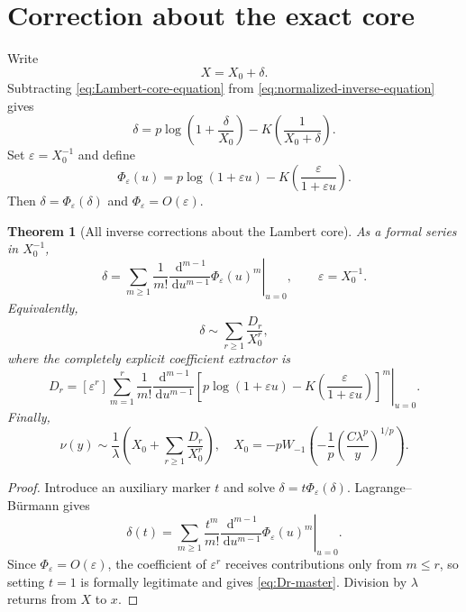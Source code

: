 \documentclass[11pt,a4paper,oneside,openany]{book}
\newtheorem{theorem}{Theorem}[chapter]
\theoremstyle{definition}
\theoremstyle{remark}
\newcommand{\dd}{\,\mathrm d}
\begin{document}
\section{Correction about the exact core}
Write
\begin{equation}
 X=X_0+\delta.
 \label{eq:X-delta}
\end{equation}
Subtracting \cref{eq:Lambert-core-equation} from
\cref{eq:normalized-inverse-equation} gives
\begin{equation}
 \delta=p\log\left(1+\frac{\delta}{X_0}\right)
 -K\!\left(\frac1{X_0+\delta}\right).
 \label{eq:delta-fixed-point}
\end{equation}
Set $\varepsilon=X_0^{-1}$ and define
\begin{equation}
 \Phi_\varepsilon(u)
 =p\log(1+\varepsilon u)
  -K\!\left(\frac{\varepsilon}{1+\varepsilon u}\right).
 \label{eq:Phi-epsilon}
\end{equation}
Then $\delta=\Phi_\varepsilon(\delta)$ and
$\Phi_\varepsilon=O(\varepsilon)$.

\begin{theorem}[All inverse corrections about the Lambert core]
\label{thm:delta-Lagrange}
As a formal series in $X_0^{-1}$,
\begin{equation}
 \boxed{
 \delta=\sum_{m\ge1}\frac1{m!}
 \left.\frac{\dd^{m-1}}{\dd u^{m-1}}
 \Phi_\varepsilon(u)^m\right|_{u=0},
 \qquad \varepsilon=X_0^{-1}.}
 \label{eq:delta-Lagrange}
\end{equation}
Equivalently,
\begin{equation}
 \delta\sim\sum_{r\ge1}\frac{D_r}{X_0^r},
 \label{eq:delta-D}
\end{equation}
where the completely explicit coefficient extractor is
\begin{equation}
 \boxed{
 D_r=[\varepsilon^r]
 \sum_{m=1}^{r}\frac1{m!}
 \left.\frac{\dd^{m-1}}{\dd u^{m-1}}
 \left[p\log(1+\varepsilon u)
 -K\!\left(\frac{\varepsilon}{1+\varepsilon u}\right)\right]^m
 \right|_{u=0}.}
 \label{eq:Dr-master}
\end{equation}
Finally,
\begin{equation}
 \boxed{
 \nu(y)\sim\frac1\lambda\left(
 X_0+\sum_{r\ge1}\frac{D_r}{X_0^r}\right),
 \quad
 X_0=-pW_{-1}\!\left(-\frac1p
 \left(\frac{C\lambda^p}{y}\right)^{1/p}\right).}
 \label{eq:inverse-W-master}
\end{equation}
\end{theorem}

\begin{proof}
Introduce an auxiliary marker $t$ and solve
$\delta=t\Phi_\varepsilon(\delta)$.  Lagrange--B\"urmann gives
\[
 \delta(t)=\sum_{m\ge1}\frac{t^m}{m!}
 \left.\frac{\dd^{m-1}}{\dd u^{m-1}}
 \Phi_\varepsilon(u)^m\right|_{u=0}.
\]
Since $\Phi_\varepsilon=O(\varepsilon)$, the coefficient of
$\varepsilon^r$ receives contributions only from $m\le r$, so setting $t=1$
is formally legitimate and gives \cref{eq:Dr-master}.  Division by $\lambda$
returns from $X$ to $x$.
\end{proof}
\end{document}

